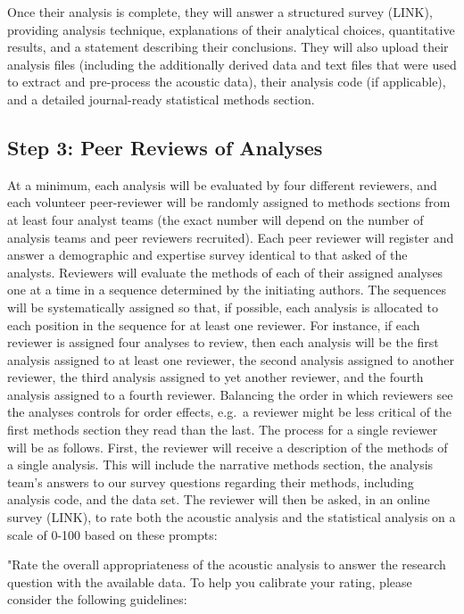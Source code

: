 \documentclass[
  english,
  man]{apa6}
\begin{document}
Once their analysis is complete, they will answer a structured survey (LINK), providing analysis technique, explanations of their analytical choices, quantitative results, and a statement describing their conclusions.
They will also upload their analysis files (including the additionally derived data and text files that were used to extract and pre-process the acoustic data), their analysis code (if applicable), and a detailed journal-ready statistical methods section.

\hypertarget{step-3-peer-reviews-of-analyses}{%
\subsection{Step 3: Peer Reviews of Analyses}\label{step-3-peer-reviews-of-analyses}}

At a minimum, each analysis will be evaluated by four different reviewers, and each volunteer peer-reviewer will be randomly assigned to methods sections from at least four analyst teams (the exact number will depend on the number of analysis teams and peer reviewers recruited).
Each peer reviewer will register and answer a demographic and expertise survey identical to that asked of the analysts.
Reviewers will evaluate the methods of each of their assigned analyses one at a time in a sequence determined by the initiating authors.
The sequences will be systematically assigned so that, if possible, each analysis is allocated to each position in the sequence for at least one reviewer.
For instance, if each reviewer is assigned four analyses to review, then each analysis will be the first analysis assigned to at least one reviewer, the second analysis assigned to another reviewer, the third analysis assigned to yet another reviewer, and the fourth analysis assigned to a fourth reviewer.
Balancing the order in which reviewers see the analyses controls for order effects, e.g.~a reviewer might be less critical of the first methods section they read than the last.
The process for a single reviewer will be as follows.
First, the reviewer will receive a description of the methods of a single analysis.
This will include the narrative methods section, the analysis team's answers to our survey questions regarding their methods, including analysis code, and the data set.
The reviewer will then be asked, in an online survey (LINK), to rate both the acoustic analysis and the statistical analysis on a scale of 0-100 based on these prompts:

"Rate the overall appropriateness of the acoustic analysis to answer the research question with the available data. To help you calibrate your rating, please consider the following guidelines:
\end{document}
